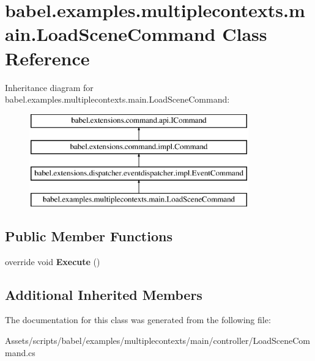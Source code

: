 \hypertarget{classbabel_1_1examples_1_1multiplecontexts_1_1main_1_1_load_scene_command}{\section{babel.\-examples.\-multiplecontexts.\-main.\-Load\-Scene\-Command Class Reference}
\label{classbabel_1_1examples_1_1multiplecontexts_1_1main_1_1_load_scene_command}
}
Inheritance diagram for babel.\-examples.\-multiplecontexts.\-main.\-Load\-Scene\-Command\-:\begin{figure}[H]
\begin{center}
\leavevmode
\includegraphics[height=4.000000cm]{classbabel_1_1examples_1_1multiplecontexts_1_1main_1_1_load_scene_command}
\end{center}
\end{figure}
\subsection*{Public Member Functions}
\begin{DoxyCompactItemize}
\item 
\hypertarget{classbabel_1_1examples_1_1multiplecontexts_1_1main_1_1_load_scene_command_a56abe7385c3c9a68400114401b84af73}{override void {\bfseries Execute} ()}\label{classbabel_1_1examples_1_1multiplecontexts_1_1main_1_1_load_scene_command_a56abe7385c3c9a68400114401b84af73}

\end{DoxyCompactItemize}
\subsection*{Additional Inherited Members}


The documentation for this class was generated from the following file\-:\begin{DoxyCompactItemize}
\item 
Assets/scripts/babel/examples/multiplecontexts/main/controller/Load\-Scene\-Command.\-cs\end{DoxyCompactItemize}
